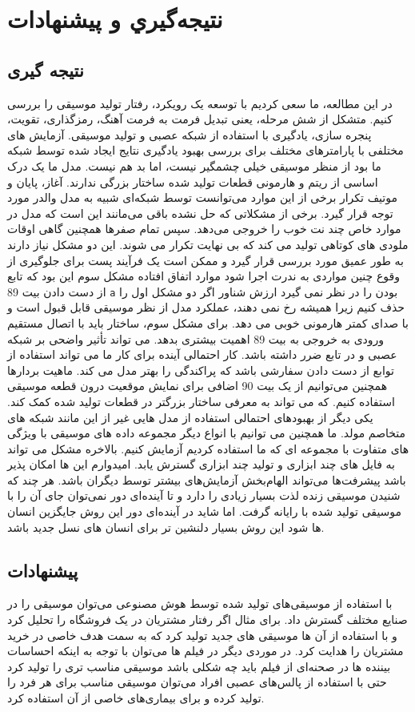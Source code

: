 \chapter{ نتيجه‌گيري و پیشنهادات}



\section{نتیجه گیری}
 در این مطالعه، ما سعی کردیم با توسعه یک رویکرد، رفتار تولید موسیقی را بررسی کنیم. 
متشکل از شش مرحله، یعنی تبدیل فرمت به فرمت آهنگ، رمزگذاری، تقویت،
پنجره سازی، یادگیری با استفاده از شبکه عصبی و تولید موسیقی. آزمایش های مختلفی با
پارامترهای مختلف برای بررسی بهبود یادگیری نتایج ایجاد شده توسط شبکه ما بود
از منظر موسیقی خیلی چشمگیر نیست، اما بد هم نیست. مدل ما یک درک اساسی از
ریتم و هارمونی قطعات تولید شده ساختار بزرگی ندارند. آغاز، پایان و موتیف
تکرار برخی از این موارد می‌توانست توسط شبکه‌ای شبیه به مدل والدر مورد توجه قرار گیرد.
برخی از مشکلاتی که حل نشده باقی می‌مانند این است که مدل در موارد خاص چند نت خوب را خروجی می‌دهد. 
سپس تمام صفرها همچنین گاهی اوقات ملودی های کوتاهی تولید می کند که بی نهایت تکرار می شوند. این دو مشکل نیاز دارند
به طور عمیق مورد بررسی قرار گیرد و ممکن است یک فرآیند پست برای جلوگیری از وقوع چنین مواردی به ندرت اجرا شود
موارد اتفاق افتاده مشکل سوم این بود که تابع از دست دادن بیت 89 
  \verb;a;
  بودن را در نظر نمی گیرد
ارزش شناور اگر دو مشکل اول را حذف کنیم زیرا همیشه رخ نمی دهند، عملکرد مدل
از نظر موسیقی قابل قبول است و با صدای کمتر هارمونی خوبی می دهد. برای مشکل سوم، ساختار
 باید با اتصال مستقیم ورودی به خروجی به بیت 89 اهمیت بیشتری بدهد.
می تواند تأثیر واضحی بر شبکه ‌عصبی و در تابع ضرر داشته باشد.
کار احتمالی آینده برای کار ما می تواند استفاده از توابع از دست دادن سفارشی باشد که پراکندگی را بهتر مدل می کند. 
ماهیت بردارها همچنین می‌توانیم از یک بیت 90 اضافی برای نمایش موقعیت درون قطعه موسیقی استفاده کنیم.
که می تواند به معرفی ساختار بزرگتر در قطعات تولید شده کمک کند. یکی دیگر از بهبودهای احتمالی
استفاده از مدل هایی غیر از این مانند شبکه های متخاصم مولد. ما همچنین می توانیم
با انواع دیگر مجموعه داده های موسیقی با ویژگی های متفاوت با مجموعه ای که ما استفاده کردیم آزمایش کنیم. بالاخره مشکل
می تواند به فایل های چند ابزاری و تولید چند ابزاری گسترش یابد. امیدوارم این ها امکان پذیر باشد
پیشرفت‌ها می‌تواند الهام‌بخش آزمایش‌های بیشتر توسط دیگران باشد.
هر چند که شنیدن موسیقی زنده لذت بسیار زیادی را دارد و تا آینده‌ای دور نمی‌توان جای آن را با موسیقی تولید شده  با رایانه گرفت. اما شاید در آینده‌ای دور این روش جایگزین انسان ها شود این روش بسیار دلنشین تر برای انسان ‌های نسل جدید باشد. 
\section{پیشنهادات}
با استفاده از موسیقی‌های تولید شده توسط هوش مصنوعی می‌توان موسیقی را در صنایع مختلف گسترش داد. برای مثال اگر رفتار مشتریان  در یک فروشگاه را تحلیل کرد و با استفاده از آن ها موسیقی های جدید تولید کرد که به سمت هدف خاصی در خرید مشتریان را هدایت کرد. در موردی دیگر در فیلم ها می‌توان با توجه به اینکه احساسات بیننده ها در صحنه‌ای از فیلم باید چه شکلی باشد موسیقی مناسب تری را تولید کرد حتی با استفاده از پالس‌های عصبی افراد می‌توان موسیقی مناسب برای هر فرد را تولید کرده و برای بیماری‌های خاصی از آن استفاده کرد. 